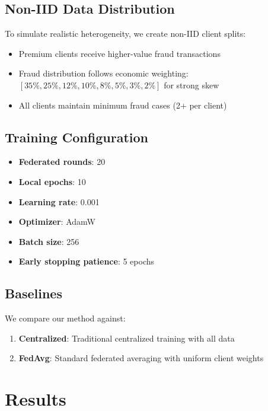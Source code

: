 \documentclass[conference]{IEEEtran}
\begin{document}
\subsection{Non-IID Data Distribution}

To simulate realistic heterogeneity, we create non-IID client splits:

\begin{itemize}
    \item Premium clients receive higher-value fraud transactions
    \item Fraud distribution follows economic weighting: $[35\%, 25\%, 12\%, 10\%, 8\%, 5\%, 3\%, 2\%]$ for strong skew
    \item All clients maintain minimum fraud cases (2+ per client)
\end{itemize}

\subsection{Training Configuration}

\begin{itemize}
    \item \textbf{Federated rounds}: 20
    \item \textbf{Local epochs}: 10
    \item \textbf{Learning rate}: 0.001
    \item \textbf{Optimizer}: AdamW
    \item \textbf{Batch size}: 256
    \item \textbf{Early stopping patience}: 5 epochs
\end{itemize}

\subsection{Baselines}

We compare our method against:

\begin{enumerate}
    \item \textbf{Centralized}: Traditional centralized training with all data
    \item \textbf{FedAvg}: Standard federated averaging \cite{mcmahan2017communication} with uniform client weights
\end{enumerate}

\section{Results}
\label{sec:results}
\end{document}
